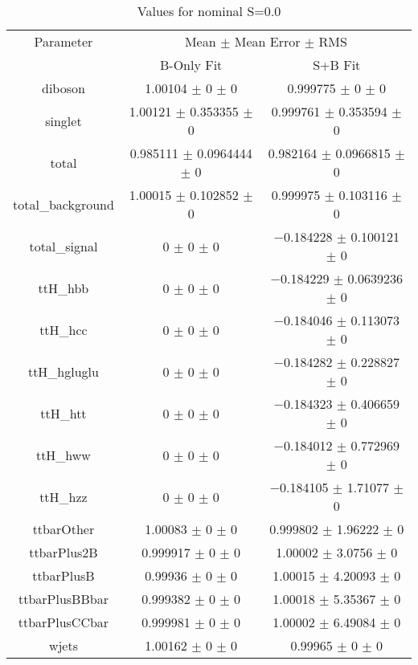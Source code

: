 \begin{table}
\centering
\caption{Values for nominal S=0.0}
\begin{tabular}{ccc}
\toprule
Parameter & \multicolumn{2}{c}{Mean $\pm$ Mean Error $\pm$ RMS}\\
 & B-Only Fit & S+B Fit\\
\midrule
diboson & \num{1.00104} $\pm$ \num{0} $\pm$ \num{0} & \num{0.999775} $\pm$ \num{0} $\pm$ \num{0}\\
singlet & \num{1.00121} $\pm$ \num{0.353355} $\pm$ \num{0} & \num{0.999761} $\pm$ \num{0.353594} $\pm$ \num{0}\\
total & \num{0.985111} $\pm$ \num{0.0964444} $\pm$ \num{0} & \num{0.982164} $\pm$ \num{0.0966815} $\pm$ \num{0}\\
total\_background & \num{1.00015} $\pm$ \num{0.102852} $\pm$ \num{0} & \num{0.999975} $\pm$ \num{0.103116} $\pm$ \num{0}\\
total\_signal & \num{0} $\pm$ \num{0} $\pm$ \num{0} & \num{-0.184228} $\pm$ \num{0.100121} $\pm$ \num{0}\\
ttH\_hbb & \num{0} $\pm$ \num{0} $\pm$ \num{0} & \num{-0.184229} $\pm$ \num{0.0639236} $\pm$ \num{0}\\
ttH\_hcc & \num{0} $\pm$ \num{0} $\pm$ \num{0} & \num{-0.184046} $\pm$ \num{0.113073} $\pm$ \num{0}\\
ttH\_hgluglu & \num{0} $\pm$ \num{0} $\pm$ \num{0} & \num{-0.184282} $\pm$ \num{0.228827} $\pm$ \num{0}\\
ttH\_htt & \num{0} $\pm$ \num{0} $\pm$ \num{0} & \num{-0.184323} $\pm$ \num{0.406659} $\pm$ \num{0}\\
ttH\_hww & \num{0} $\pm$ \num{0} $\pm$ \num{0} & \num{-0.184012} $\pm$ \num{0.772969} $\pm$ \num{0}\\
ttH\_hzz & \num{0} $\pm$ \num{0} $\pm$ \num{0} & \num{-0.184105} $\pm$ \num{1.71077} $\pm$ \num{0}\\
ttbarOther & \num{1.00083} $\pm$ \num{0} $\pm$ \num{0} & \num{0.999802} $\pm$ \num{1.96222} $\pm$ \num{0}\\
ttbarPlus2B & \num{0.999917} $\pm$ \num{0} $\pm$ \num{0} & \num{1.00002} $\pm$ \num{3.0756} $\pm$ \num{0}\\
ttbarPlusB & \num{0.99936} $\pm$ \num{0} $\pm$ \num{0} & \num{1.00015} $\pm$ \num{4.20093} $\pm$ \num{0}\\
ttbarPlusBBbar & \num{0.999382} $\pm$ \num{0} $\pm$ \num{0} & \num{1.00018} $\pm$ \num{5.35367} $\pm$ \num{0}\\
ttbarPlusCCbar & \num{0.999981} $\pm$ \num{0} $\pm$ \num{0} & \num{1.00002} $\pm$ \num{6.49084} $\pm$ \num{0}\\
wjets & \num{1.00162} $\pm$ \num{0} $\pm$ \num{0} & \num{0.99965} $\pm$ \num{0} $\pm$ \num{0}\\
\bottomrule
\end{tabular}
\end{table}